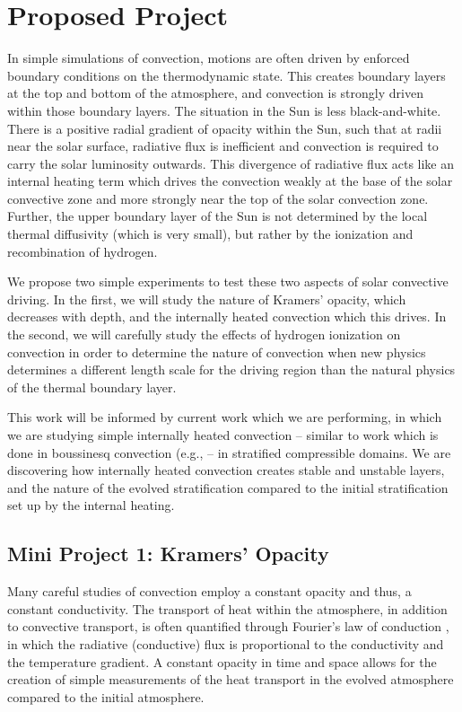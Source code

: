 \documentclass[aasms,12pt]{article}
\begin{document}
\section{Proposed Project}
In simple simulations of convection, motions are often driven by enforced boundary conditions
on the thermodynamic state.  This creates boundary layers at the top and bottom of the atmosphere,
and convection is strongly driven within those boundary layers.  The situation in the Sun is less
black-and-white.  There is a positive radial gradient of opacity within the Sun, such that at
radii near the solar surface, radiative flux is inefficient and convection is required to carry
the solar luminosity outwards.  This divergence of radiative flux acts like an internal heating term
which drives the convection weakly at the base of the solar convective zone and more strongly near the
top of the solar convection zone.  Further, the upper boundary layer of the Sun is not determined by the
local thermal diffusivity (which is very small), but rather by the ionization and recombination of hydrogen.

We propose two simple experiments to test these two aspects of solar convective driving.  In the first,
we will study the nature of Kramers' opacity, which decreases with depth, and the internally heated
convection which this drives.  In the second, we will carefully study the effects of hydrogen ionization
on convection in order to determine the nature of convection when new physics determines a different length
scale for the driving region than the natural physics of the thermal boundary layer.

This work will be informed by current work which we are performing, in which we are studying
simple internally heated convection -- similar to work which is done in boussinesq convection
(e.g., \cite{goluskin&spiegel2012} -- in stratified compressible domains.  We are
discovering how internally heated convection creates stable and unstable layers, and the
nature of the evolved stratification compared to the initial stratification set up by the
internal heating.

\subsection{Mini Project 1: Kramers' Opacity}
Many careful studies of convection employ a constant opacity and thus, a constant conductivity.
The transport of heat within the atmosphere, in addition to convective transport, is often 
quantified through Fourier's law of conduction \citep{lecoanet&all2014}, in which the radiative
(conductive) flux is proportional to the conductivity and the temperature gradient.  
A constant opacity in time and space allows for the creation of simple measurements of the
heat transport in the evolved atmosphere compared to the initial atmosphere.  
\end{document}
